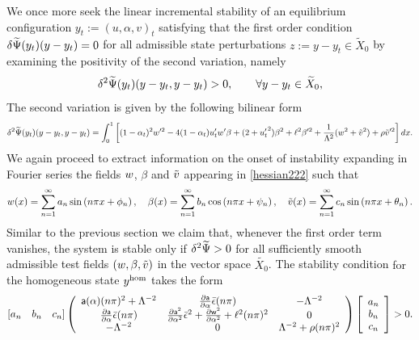 We once more seek the linear incremental stability of an equilibrium configuration $y_t := (u, \alpha,  v)_t$ satisfying that the first order condition $\delta \widetilde\Psi(y_t)(y-y_t)=0$ for all admissible state perturbations $z:=y-y_t\in\widetilde X_0$ by examining the positivity of the second variation, namely
\begin{equation*}
    \delta^2 \widetilde\Psi(y_t)(y-y_t, y-y_t)>0, \qquad \forall y-y_t\in \widetilde X_0,
\end{equation*}The second variation is given by the following bilinear form
\begin{equation}
    \delta^2 \widetilde\Psi(y_t)(y-y_t, y-y_t)=\int_0^1 \left[(1-\alpha_t)^2w'^2
        - 4(1-\alpha_t)u_t' w'\beta+(2+ {u_t'}^2)\beta^2+\ell^2\beta'^2 +\frac{1}{\Lambda^2}( w^2 + \tilde v^2)+\rho \tilde v'^2\right]dx.\label{hessian222}\end{equation}
We again proceed to extract information on the onset of instability expanding in Fourier series the fields $w$, $\beta$ and $\tilde v$ appearing in \eqref{hessian222} such that
\[
    w(x) = \sum_{n=1}^{\infty} a_{n} \sin \left(n \pi x + \phi_{n}\right),
    \quad\beta(x) = \sum_{n=1}^{\infty} b_{n} \cos \left(n \pi x + \psi_{n}\right),
    \quad\tilde v(x) = \sum_{n=1}^{\infty} c_{n} \sin \left(n \pi x + \theta_{n}\right).
\]
% 
Similar to the previous section we claim that, whenever the first order term vanishes, the system is stable only if $\delta^2 \widetilde\Psi
    >0$ for all sufficiently smooth admissible test fields $(w, \beta, \tilde v)$ in the vector space $\widetilde{ X_0}$. The stability condition {for the homogeneous state $y^{\text{hom}}$}  takes the form
\begin{align}
    \left[ a_n \quad b_n \quad c_n \right]\left(
    \begin{array}{ccc}
            \mathsf{a}(\alpha)(n\pi)^2+\Lambda^{-2}                     & \frac{\partial \mathsf{a}}{\partial \alpha}\bar\epsilon(n\pi)                                                                      & -\Lambda^{-2}                      \\
            \frac{\partial \mathsf{a}}{\partial \alpha}\bar\epsilon(n\pi) & \frac{\partial \mathsf{a}^2}{\partial \alpha^2}\bar\epsilon^2+ \frac{\partial \mathsf{w}^2}{\partial \alpha^2}+\ell^2(n\pi)^2 & 0                                    \\
            -\Lambda^{-2}                                            & 0                                                                                                                               & \Lambda^{-2} +\rho (n\pi)^2 \\
        \end{array}
    \right)\left[ \begin{array}{c} a_n \\ b_n \\c_n \end{array} \right]>0.\label{hessian3}\end{align}
